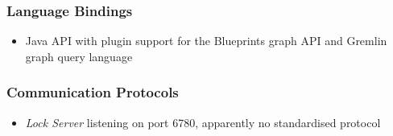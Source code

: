 
\subsubsection{Language Bindings} %
\label{ssub:language_bindings}

\begin{itemize}
	\item Java API with plugin support for the Blueprints graph API and Gremlin graph query language
\end{itemize}


\subsubsection{Communication Protocols} %
\label{ssub:communication_protocols}

\begin{itemize}
	\item \emph{Lock Server} listening on port 6780, apparently no standardised protocol
\end{itemize}

